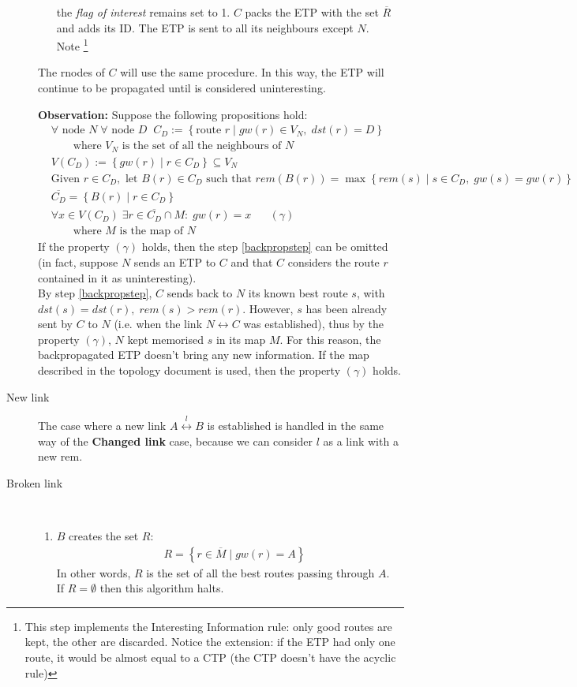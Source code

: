\documentclass[a4paper]{article}
\newcommand{\T}[1]{\textrm{#1}}
\newcommand{\pgra}[1]{\left\{#1\right\}}
\newcommand{\eal}[1]{{\begin{align*} #1 \end{align*}}}
\def\ove#1{{\overline{#1}}}
\newcommand{\qq}{\qquad}
\def\0{{\emptyset}}
\def\^{{\cap}}
\def\({{\subseteq}}
\def\'{{\;\;\;}}
\begin{document}
\begin{description}
\begin{enumerate}
		the \emph{flag of interest} remains set to 1.
		$C$ packs the ETP with the set $\ove R$ and adds its ID.
		The ETP is sent to all its neighbours except $N$.\\
		Note \footnote{This step implements the Interesting
		Information rule: only
		good routes are kept, the other are discarded. Notice
		the extension: if the ETP had only one route, it would be
		almost equal to a CTP (the CTP doesn't have the acyclic rule)}
	\end{enumerate}
	The rnodes of $C$ will use the same procedure. In this way, the ETP
	will continue to be propagated until is considered uninteresting.

	\textbf{Observation: }Suppose the following propositions hold:
	\eal{
	&\forall \T{ node }N\;\forall \T{ node }D\;\;
	C_D:= \pgra{\T{route }r\;|\;gw(r)\in V_N,\;dst(r)=D}\\
	&\qq\T{where $V_N$ is the set of all the neighbours of $N$}\\
	&V(C_D):=\pgra{gw(r)\;|\;r\in C_D} \( V_N\\
	&\T{Given } r \in C_D, \T{ let } B(r)\in C_D \T{ such that } 
	rem(B(r))=\max\pgra{rem(s)\;|\;s\in C_D,\;gw(s)=gw(r)}\\
	&\ove {C_D} = \pgra{B(r)\;|\;r\in C_D}\\
	&\forall x\in V(C_D)\;\exists r\in
	\ove{C_D}\^M:\;gw(r)=x\'\'(\gamma)\\
	&\qq\T{where $M$ is the map of $N$}
	}
	If the property $(\gamma)$ holds, then the step \ref{backpropstep}
	can be omitted (in fact, suppose $N$ sends an ETP to $C$ and that $C$
	considers the route $r$ contained in it as uninteresting).\\
	By step \ref{backpropstep}, $C$ sends back to $N$ its known best route
	$s$, with $dst(s)=dst(r),\;rem(s)>rem(r)$. However, $s$ has been
	already sent by $C$ to $N$ (i.e. when the link $N\leftrightarrow C$
	was established), thus by the property $(\gamma)$, $N$ kept memorised
	$s$ in its map $M$. For this reason, the backpropagated ETP doesn't
	bring any new information. If the map described in the topology
	document\cite{ntktopology} is used, then the property $(\gamma)$
	holds.
	
	\item[New link]
	The case where a new link $A \stackrel{l}{\leftrightarrow} B$
	is established is handled  in the same way of the
	\textbf{Changed link} case, because we can consider $l$ as a link with
	a new rem.

	\item[Broken link] \qq\\
		\begin{enumerate}
		\item \label{stepR} $B$ creates the set $R$:
			\eal{
			&R=\pgra{r\in \overline{M}\;|\; gw(r)=A}}
			In other words, 
			$R$ is the set of all the best routes passing through
			$A$. \\
			If $R=\0$ then this algorithm halts.
			

\end{enumerate}
\end{description}
\end{document}

